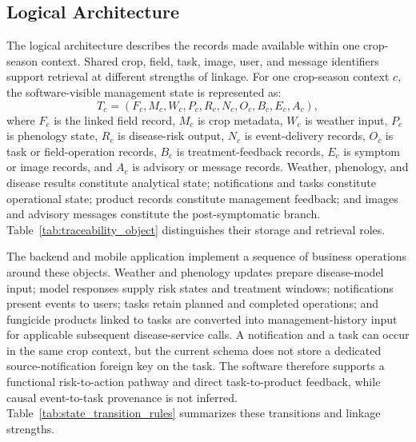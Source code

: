 \documentclass[12pt]{article}
\begin{document}
\subsection{Logical Architecture}\label{crop-season-object-and-workflow-states}

The logical architecture describes the records made available within one crop-season context. Shared crop, field, task, image, user, and message identifiers support retrieval at different strengths of linkage. For one crop-season context \(c\), the software-visible management state is represented as:
\begin{equation}
T_c =
\left(
F_c, M_c, W_c, P_c, R_c, N_c, O_c, B_c, E_c, A_c
\right),
\label{eq:crop_season_traceability_object}
\end{equation}
where \(F_c\) is the linked field record, \(M_c\) is crop metadata, \(W_c\) is weather input, \(P_c\) is phenology state, \(R_c\) is disease-risk output, \(N_c\) is event-delivery records, \(O_c\) is task or field-operation records, \(B_c\) is treatment-feedback records, \(E_c\) is symptom or image records, and \(A_c\) is advisory or message records. Weather, phenology, and disease results constitute analytical state; notifications and tasks constitute operational state; product records constitute management feedback; and images and advisory messages constitute the post-symptomatic branch. Table~\ref{tab:traceability_object} distinguishes their storage and retrieval roles.

The backend and mobile application implement a sequence of business operations around these objects. Weather and phenology updates prepare disease-model input; model responses supply risk states and treatment windows; notifications present events to users; tasks retain planned and completed operations; and fungicide products linked to tasks are converted into management-history input for applicable subsequent disease-service calls. A notification and a task can occur in the same crop context, but the current schema does not store a dedicated source-notification foreign key on the task. The software therefore supports a functional risk-to-action pathway and direct task-to-product feedback, while causal event-to-task provenance is not inferred. Table~\ref{tab:state_transition_rules} summarizes these transitions and linkage strengths.
\end{document}
